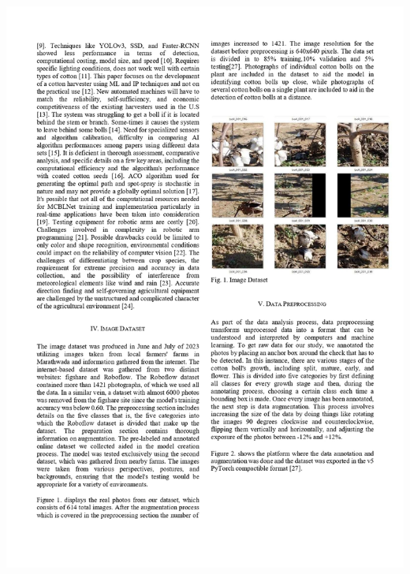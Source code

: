 \documentclass[12pt,a4paper]{report}
\begin{document}
\includegraphics[scale =0.7]{images/copyright/publication/Publication/Publication_page-0003.jpg}
\newpage
\end{document}
